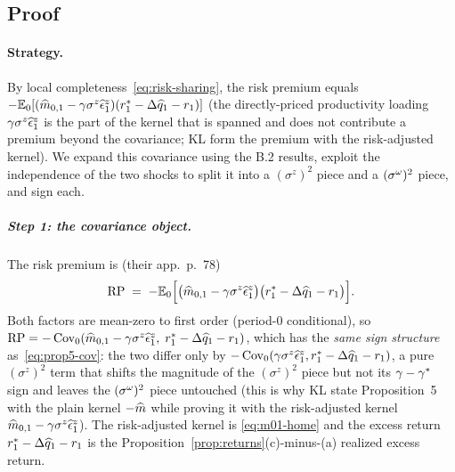 
\subsection{Proof}

\paragraph{Strategy.} By local completeness~\eqref{eq:risk-sharing}, the risk
premium equals
$-\mathbb{E}_0[(\widehat{m}_{0,1}-\gamma\sigma^z\widehat{\epsilon}^z_1)(r^{*}_1-\Delta\widehat{q}_1-r_1)]$
(the directly-priced productivity loading $\gamma\sigma^z\widehat{\epsilon}^z_1$ is the
part of the kernel that is spanned and does not contribute a premium beyond the
covariance; KL form the premium with the risk-adjusted kernel). We expand this
covariance using the B.2 results, exploit the independence of the two shocks to
split it into a $(\sigma^z)^2$ piece and a $(\sigma^{\omega})^2$ piece, and sign each.

\subparagraph{Step 1: the covariance object.} The risk premium is (their
app.~p.~78)
\begin{equation}
\text{RP} \;=\; -\mathbb{E}_0\Bigl[\bigl(\widehat{m}_{0,1}-\gamma\sigma^z\widehat{\epsilon}^z_1\bigr)\bigl(r^{*}_1-\Delta\widehat{q}_1-r_1\bigr)\Bigr]. \label{eq:prop5-RP}
\end{equation}
Both factors are mean-zero to first order (period-$0$ conditional), so
$\text{RP}=-\operatorname{Cov}_0(\widehat{m}_{0,1}-\gamma\sigma^z\widehat{\epsilon}^z_1,\;r^{*}_1-\Delta\widehat{q}_1-r_1)$,
which has the \emph{same sign structure} as~\eqref{eq:prop5-cov}: the two differ
only by $-\operatorname{Cov}_0(\gamma\sigma^z\widehat{\epsilon}^z_1,r^{*}_1-\Delta\widehat{q}_1-r_1)$, a
pure $(\sigma^z)^2$ term that shifts the magnitude of the $(\sigma^z)^2$ piece but
not its $\gamma-\gamma^{*}$ sign and leaves the $(\sigma^{\omega})^2$ piece untouched (this
is why KL state Proposition~5 with the plain kernel $-\widehat{m}$ while proving it
with the risk-adjusted kernel $\widehat{m}_{0,1}-\gamma\sigma^z\widehat{\epsilon}^z_1$). The
risk-adjusted kernel is \eqref{eq:m01-home} and the excess return
$r^{*}_1-\Delta\widehat{q}_1-r_1$ is the
Proposition~\ref{prop:returns}(c)-minus-(a) realized excess return.

